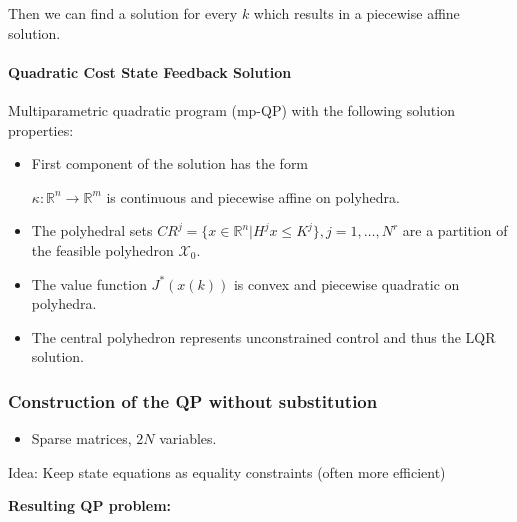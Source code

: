 \documentclass[8pt,a4paper]{scrartcl}
\begin{document}
\begin{multicols*}{3}
\begin{enumerate}
Then we can find a solution for every $k$ which results in a piecewise affine solution.
\end{enumerate}

\paragraph{Quadratic Cost State Feedback Solution}

Multiparametric quadratic program (mp-QP) with the following solution properties:

\begin{itemize}
\item First component of the solution has the form


$\kappa:\mathbb{R}^n\rightarrow\mathbb{R}^m$ is continuous and piecewise affine on polyhedra.

\item The polyhedral sets $CR^j=\{x\in\mathbb{R}^n|H^j x\leq K^j\},j=1,\ldots,N^r$ are a partition of the feasible polyhedron $\mathcal{X}_0$.
\item The value function $J^\ast(x(k))$ is convex and piecewise quadratic on polyhedra.
\item The central polyhedron represents unconstrained control and thus the LQR solution.
\end{itemize}

\subsubsection{Construction of the QP without substitution}

\begin{itemize}
\item Sparse matrices, $2N$ variables.
\end{itemize}

Idea: Keep state equations as equality constraints (often more efficient)

\finn

\textbf{Resulting QP problem:}



\end{multicols*}
\end{document}
